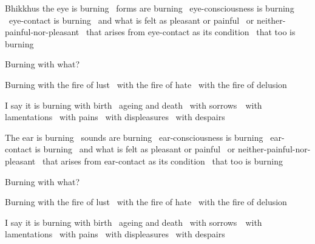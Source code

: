 \begin{english-only-hang}
  Bhikkhus the eye is burning \breathmark\ forms are burning \breathmark\ eye-consciousness is burning \breathmark\ eye-contact is burning \breathmark\ and what is felt as pleasant or painful \breathmark\ or neither-painful-nor-pleasant \breathmark\ that arises from eye-contact as its condition \breathmark\ that too is burning
\end{english-only-hang}
\begin{english-only-hang-together}
  Burning with what?
\end{english-only-hang-together}
\begin{english-only-hang-together}
  Burning with the fire of lust \breathmark\ with the fire of hate \breathmark\ with the fire of delusion
\end{english-only-hang-together}
\begin{english-only-hang-together}
  I say it is burning with birth \breathmark\ ageing and death \breathmark\ with \mbox{sorrows}~\breathmark\ with lamentations \breathmark\ with pains \breathmark\ with displeasures \breathmark\ with despairs
\end{english-only-hang-together}

\ifninebythirteen\clearpage\fi

\begin{english-only-hang}
  The ear is burning \breathmark\ sounds are burning \breathmark\ ear-consciousness is burning \breathmark\ ear-contact is burning \breathmark\ and what is felt as pleasant or painful \breathmark\ or neither-painful-nor-pleasant \breathmark\ that arises from ear-contact as its condition \breathmark\ that too is burning
\end{english-only-hang}
\begin{english-only-hang-together}
  Burning with what?
\end{english-only-hang-together}
\begin{english-only-hang-together}
  Burning with the fire of lust \breathmark\ with the fire of hate \breathmark\ with the fire of delusion
\end{english-only-hang-together}
\begin{english-only-hang-together}
  I say it is burning with birth \breathmark\ ageing and death \breathmark\ with \mbox{sorrows}~\breathmark\ with lamentations \breathmark\ with pains \breathmark\ with displeasures \breathmark\ with despairs
\end{english-only-hang-together}

